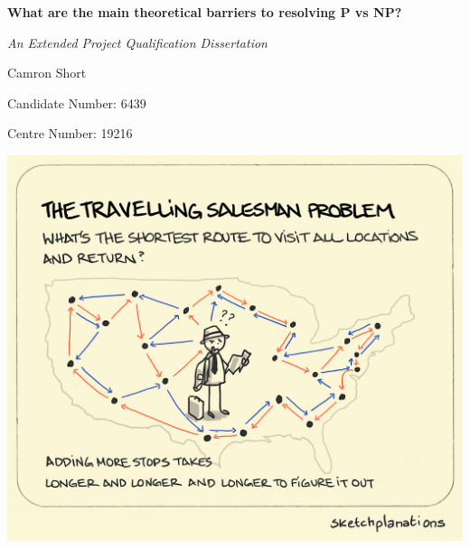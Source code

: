 \documentclass[12pt]{report}
\begin{document}
\begin{titlepage}
    \centering
    \vspace*{1cm}
    
    {\Huge\bfseries What are the main theoretical barriers to resolving P vs NP?\par}
    \vspace{1.5cm}
    
    {\Large\itshape An Extended Project Qualification Dissertation\par}
    \vspace{2cm}
    
    {\Large Camron Short\par}
    {\large Candidate Number: 6439\par}
    {\large Centre Number: 19216\par}
    \vspace{0.7cm}

    \includegraphics[width=1\textwidth]{CoverPhoto.jpg}
    \vspace{1cm}
    
    \thispagestyle{empty}
\end{titlepage}
\end{document}
